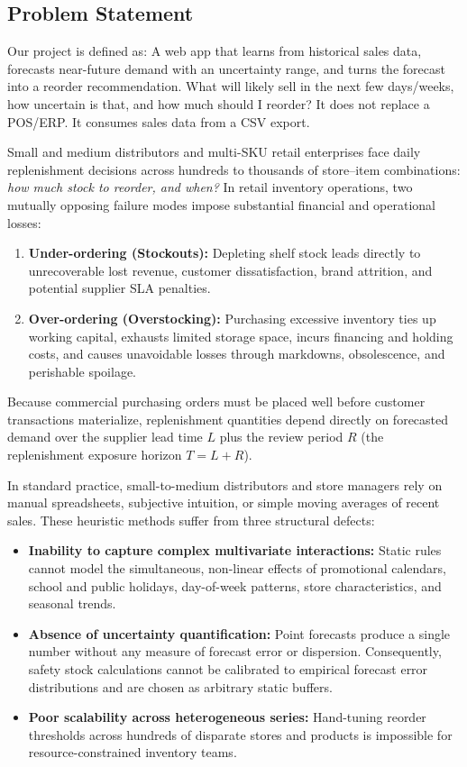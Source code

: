 \documentclass[11pt,a4paper]{article}
\begin{document}
\subsection{Problem Statement}
Our project is defined as: A web app that learns from historical sales data, forecasts near-future demand with an uncertainty range, and turns the forecast into a reorder recommendation. What will likely sell in the next few days/weeks, how uncertain is that, and how much should I reorder? It does not replace a POS/ERP. It consumes sales data from a CSV export.

Small and medium distributors and multi-SKU retail enterprises face daily replenishment decisions across hundreds to thousands of store--item combinations: \emph{how much stock to reorder, and when?} In retail inventory operations, two mutually opposing failure modes impose substantial financial and operational losses:
\begin{enumerate}
    \item \textbf{Under-ordering (Stockouts):} Depleting shelf stock leads directly to unrecoverable lost revenue, customer dissatisfaction, brand attrition, and potential supplier SLA penalties.
    \item \textbf{Over-ordering (Overstocking):} Purchasing excessive inventory ties up working capital, exhausts limited storage space, incurs financing and holding costs, and causes unavoidable losses through markdowns, obsolescence, and perishable spoilage.
\end{enumerate}

Because commercial purchasing orders must be placed well before customer transactions materialize, replenishment quantities depend directly on forecasted demand over the supplier lead time $L$ plus the review period $R$ (the replenishment exposure horizon $T = L + R$).

In standard practice, small-to-medium distributors and store managers rely on manual spreadsheets, subjective intuition, or simple moving averages of recent sales. These heuristic methods suffer from three structural defects:
\begin{itemize}
    \item \textbf{Inability to capture complex multivariate interactions:} Static rules cannot model the simultaneous, non-linear effects of promotional calendars, school and public holidays, day-of-week patterns, store characteristics, and seasonal trends.
    \item \textbf{Absence of uncertainty quantification:} Point forecasts produce a single number without any measure of forecast error or dispersion. Consequently, safety stock calculations cannot be calibrated to empirical forecast error distributions and are chosen as arbitrary static buffers.
    \item \textbf{Poor scalability across heterogeneous series:} Hand-tuning reorder thresholds across hundreds of disparate stores and products is impossible for resource-constrained inventory teams.
\end{itemize}
\end{document}
